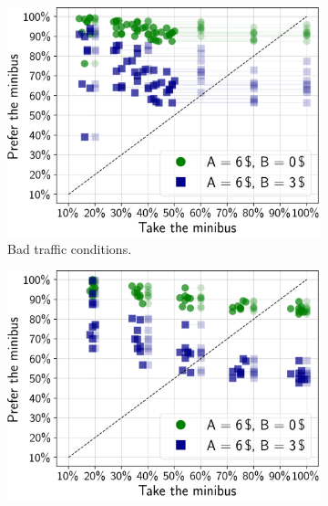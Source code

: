 \documentclass[12pt,notitlepage]{article}
\begin{document}
\begin{figure}
\centering

\begin{subfigure}{0.32\textwidth}
	\includegraphics[width=\textwidth]{20210616-OPT1/c_grid_study1b/UTC-20210623-191629/e_evo_plots/evo__graph_h=6__graph_ttt_factor=3}
	
	\caption{Bad traffic conditions.}
	\label{f:game1-bad}
\end{subfigure}
%
\hfill
%
\begin{subfigure}{0.32\textwidth}
	\includegraphics[width=\textwidth]{20210616-OPT1/c_grid_study1/UTC-20210621-232339/e_evo_plots/evo}
	

\end{subfigure}
\end{figure}
\end{document}
